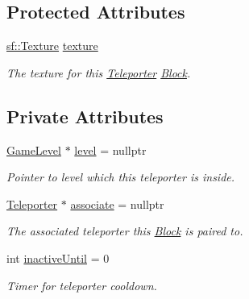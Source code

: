 \subsection*{Protected Attributes}
\begin{DoxyCompactItemize}
\item 
\mbox{\label{class_teleporter_a9bece367478b8ba85f6f2f5db9cbf117}} 
\mbox{\hyperlink{classsf_1_1_texture}{sf\+::\+Texture}} \mbox{\hyperlink{class_teleporter_a9bece367478b8ba85f6f2f5db9cbf117}{texture}}
\begin{DoxyCompactList}\small\item\em The texture for this \mbox{\hyperlink{class_teleporter}{Teleporter}} \mbox{\hyperlink{class_block}{Block}}. \end{DoxyCompactList}\end{DoxyCompactItemize}
\subsection*{Private Attributes}
\begin{DoxyCompactItemize}
\item 
\mbox{\label{class_teleporter_a306d3b102e275c36d5c0702b3113937b}} 
\mbox{\hyperlink{class_game_level}{Game\+Level}} $\ast$ \mbox{\hyperlink{class_teleporter_a306d3b102e275c36d5c0702b3113937b}{level}} = nullptr
\begin{DoxyCompactList}\small\item\em Pointer to level which this teleporter is inside. \end{DoxyCompactList}\item 
\mbox{\label{class_teleporter_abd287de4591c09c1a53c1f39bbf60377}} 
\mbox{\hyperlink{class_teleporter}{Teleporter}} $\ast$ \mbox{\hyperlink{class_teleporter_abd287de4591c09c1a53c1f39bbf60377}{associate}} = nullptr
\begin{DoxyCompactList}\small\item\em The associated teleporter this \mbox{\hyperlink{class_block}{Block}} is paired to. \end{DoxyCompactList}\item 
\mbox{\label{class_teleporter_a1adc501bc52a19fdf536d47f286e1298}} 
int \mbox{\hyperlink{class_teleporter_a1adc501bc52a19fdf536d47f286e1298}{inactive\+Until}} = 0
\begin{DoxyCompactList}\small\item\em Timer for teleporter cooldown. \end{DoxyCompactList}\end{DoxyCompactItemize}
